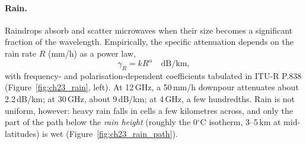 \paragraph{Rain.} Raindrops absorb and scatter microwaves when their size becomes a significant
fraction of the wavelength. Empirically, the specific attenuation depends on the rain rate $R$
(mm/h) as a power law,
\begin{equation}
\gamma_R=kR^{\alpha}\quad\text{dB/km},
\label{eq:ch23:krate}
\end{equation}
with frequency- and polarisation-dependent coefficients tabulated in ITU-R P.838
(Figure~\ref{fig:ch23_rain}, left). At 12\,GHz, a 50\,mm/h downpour attenuates about
2.2\,dB/km; at 30\,GHz, about 9\,dB/km; at 4\,GHz, a few hundredths. Rain is not uniform,
however: heavy rain falls in cells a few kilometres across, and only the part of the path
below the \emph{rain height} (roughly the 0$^\circ$C isotherm, 3--5\,km at mid-latitudes) is
wet (Figure~\ref{fig:ch23_rain_path}).



